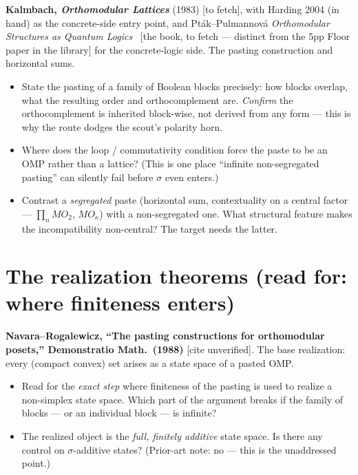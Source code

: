 \documentclass[11pt]{article}
\begin{document}
\noindent\textbf{Kalmbach, \emph{Orthomodular Lattices}} (1983) \textup{[to fetch]}, with
Harding 2004 (in hand) as the concrete-side entry point, and Pt\'ak--Pulmannov\'a
\emph{Orthomodular Structures as Quantum Logics}~\cite{PtakPulmannova1991} \textup{[the
book, to fetch --- distinct from the 5pp Floor paper in the library]} for the
concrete-logic side. The pasting construction and horizontal sums.
\begin{itemize}[leftmargin=*]
  \item State the pasting of a family of Boolean blocks precisely: how blocks overlap,
    what the resulting order and orthocomplement are. \emph{Confirm} the orthocomplement
    is inherited block-wise, not derived from any form --- this is why the route dodges
    the scout's polarity horn.
  \item Where does the loop / commutativity condition force the paste to be an OMP
    rather than a lattice? (This is one place ``infinite non-segregated pasting'' can
    silently fail before $\sigma$ even enters.)
  \item Contrast a \emph{segregated} paste (horizontal sum, contextuality on a central
    factor --- $\prod_n MO_2$, $MO_\kappa$) with a non-segregated one. What structural
    feature makes the incompatibility non-central? The target needs the latter.
\end{itemize}

\section{The realization theorems (read for: where finiteness enters)}

\noindent\textbf{Navara--Rogalewicz, ``The pasting constructions for orthomodular
posets,'' Demonstratio Math.\ (1988)} \textup{[cite unverified]}. The base realization:
every (compact convex) set arises as a state space of a pasted OMP.
\begin{itemize}[leftmargin=*]
  \item Read for the \emph{exact step} where finiteness of the pasting is used to realize
    a non-simplex state space. Which part of the argument breaks if the family of blocks
    --- or an individual block --- is infinite?
  \item The realized object is the \emph{full, finitely additive} state space. Is there
    any control on $\sigma$-additive states? (Prior-art note: no --- this is the
    unaddressed point.)
\end{itemize}
\end{document}
